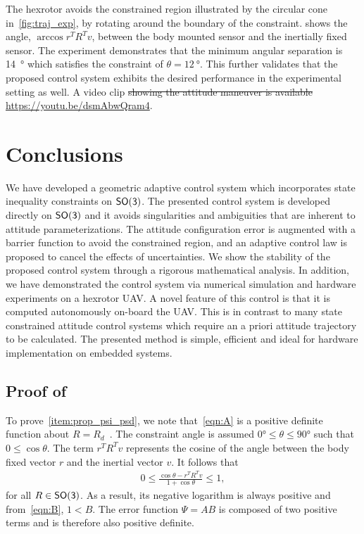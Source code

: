 \documentclass[10pt,fleqn]{IJCAS}  %
\providecommand{\DIFadd}[1]{{\protect\color{blue}\uwave{#1}}} %
\providecommand{\DIFdel}[1]{{\protect\color{red}\sout{#1}}}                      %
\providecommand{\DIFaddbegin}{} %
\providecommand{\DIFaddend}{} %
\providecommand{\DIFdelbegin}{} %
\providecommand{\DIFdelend}{} %
\begin{document}
\begin{multicols}{2}
\DIFaddend The hexrotor avoids the constrained region illustrated by the circular cone in~\cref{fig:traj_exp}, by rotating around the boundary of the constraint. 
 shows the angle, \( \arccos r^T R^T v \), between the body mounted sensor and the inertially fixed sensor.
The experiment demonstrates that the minimum angular separation is \SI{14}{\degree} which satisfies the constraint of \( \theta = \SI{12}{\degree} \).
This further validates that the proposed control system exhibits the desired performance in the experimental setting as well. 
A video clip \DIFdelbegin \DIFdel{showing the attitude maneuver is available }\DIFdelend \DIFaddbegin \DIFadd{is available at }\DIFaddend \url{https://youtu.be/dsmAbwQram4}.

\section{Conclusions}\label{sec:conclusions}
We have developed a geometric adaptive control system which incorporates state inequality constraints on \(\mathsf{SO(3)}\).
The presented control system is developed directly on \(\mathsf{SO(3)}\) and it avoids singularities and ambiguities that are inherent to attitude parameterizations.
The attitude configuration error is augmented with a barrier function to avoid the constrained region, and an adaptive control law is proposed to cancel the effects of uncertainties. 
We show the stability of the  proposed control system through a rigorous mathematical analysis.
In addition, we have demonstrated the control system via numerical simulation and hardware experiments on a hexrotor UAV.
A novel feature of this control is that it is computed autonomously on-board the UAV.
This is in contrast to many state constrained attitude control systems which require an a priori attitude trajectory to be calculated. 
The presented method is simple, efficient and ideal for hardware implementation on embedded systems.

\appendix
\subsection{Proof of~}\label{proof:config_error}
To prove~\cref{item:prop_psi_psd}, we note that~\cref{eqn:A} is a positive definite function about \( R = R_d \)~\cite{bullo2004}.
The constraint angle is assumed \( \ang{0} \leq \theta \leq \ang{90} \) such that \( 0 \leq \cos \theta \).
The term \( r^T R^T v \) represents the cosine of the angle between the body fixed vector \( r \) and the inertial vector \( v \). 
It follows that
\begin{align*}
	0 \leq  \frac{\cos \theta -  r^T R^T v}{1 + \cos \theta} \leq 1 ,
\end{align*}
for all \( R \in \mathsf{SO(3)} \). 
As a result, its negative logarithm is always positive and from~\cref{eqn:B}, \(1 < B\).
The error function \( \Psi = A B \) is composed of two positive terms and is therefore also positive definite.


\end{multicols}
\end{document}
